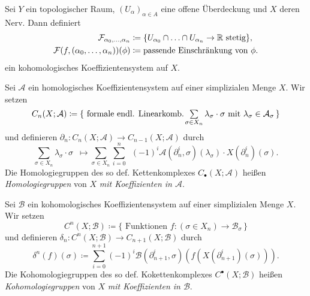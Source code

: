 \documentclass{cheat-sheet}
\newcommand{\nspace}[1]{\foreach \i in {1,...,#1}{ \! }} %
\begin{document}

\begin{bsp}
  Sei $Y$ ein topologischer Raum, $(U_\alpha)_{\alpha \in A}$ eine offene Überdeckung und $X$ deren Nerv. Dann definiert
  \begin{align*}
    \mathcal{F}_{\alpha_0, \ldots, \alpha_n} & \coloneqq \{ U_{\alpha_0} \cap \ldots \cap U_{\alpha_n} \to \mathbb{R} \text{ stetig} \}, \\
    \mathcal{F}(f, (\alpha_0, \ldots, \alpha_n))(\phi) & \coloneqq \text{passende Einschränkung von $\phi$}.
  \end{align*}
  ein kohomologisches Koeffizientensystem auf $X$.
\end{bsp}


\begin{defn}
  Sei $\mathcal{A}$ ein homologisches Koeffizientensystem auf einer simplizialen Menge $X$. Wir setzen
  \[ C_n(X; \mathcal{A}) \coloneqq \{ \text{ formale endl. Linearkomb. } \nspace{3} \sum_{\sigma \in X_n} \lambda_\sigma \cdot \sigma \text{ mit } \lambda_\sigma \in \mathcal{A}_\sigma \, \} \]
  und definieren $\partial_n : C_n(X; \mathcal{A}) \to C_{n-1}(X; \mathcal{A})$ durch
  \[ \sum_{\sigma \in X_n} \lambda_\sigma \cdot \sigma \enspace \mapsto \sum_{\sigma \in X_n} \sum_{i=0}^n \enspace (-1)^i \mathcal{A}(\partial_n^i, \sigma)(\lambda_\sigma) \cdot X(\partial_n^i)(\sigma). \]
  Die Homologiegruppen des so def. Kettenkomplexes $C_\bullet(X; \mathcal{A})$ heißen \emph{Homologiegruppen} von $X$ \emph{mit Koeffizienten in $\mathcal{A}$}.
\end{defn}

\begin{defn}
  Sei $\mathcal{B}$ ein kohomologisches Koeffizientensystem auf einer simplizialen Menge $X$. Wir setzen
  \[ C^n(X; \mathcal{B}) \coloneqq \{ \text{ Funktionen } f : (\sigma \in X_n) \to \mathcal{B}_\sigma \, \} \]
  und definieren $\delta_n : C^n(X; \mathcal{B}) \to C_{n+1}(X; \mathcal{B})$ durch
  \[ \delta^n(f)(\sigma) \coloneqq \sum_{i=0}^{n+1} (-1)^i \mathcal{B}(\partial_{n+1}^i, \sigma)(f(X(\partial_{n+1}^i)(\sigma))). \]
  Die Kohomologiegruppen des so def. Kokettenkomplexes $C^\bullet(X; \mathcal{B})$ heißen \emph{Kohomologiegruppen} von $X$ \emph{mit Koeffizienten in $\mathcal{B}$}.
\end{defn}
\end{document}
